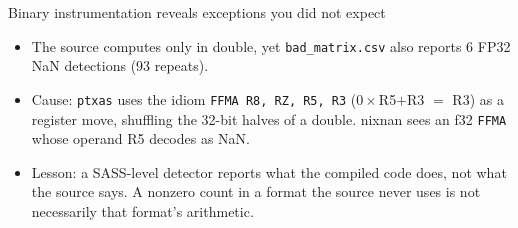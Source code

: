 \documentclass[aspectratio=169,10pt,xcolor=table]{beamer}
\begin{document}
\begin{frame}{Binary instrumentation reveals exceptions you did not expect}
\small
\begin{itemize}
\item The source computes only in double, yet \texttt{bad\_matrix.csv} also reports 6 FP32 NaN detections (93 repeats).
\item Cause: \texttt{ptxas} uses the idiom \texttt{FFMA R8, RZ, R5, R3} ($0\times$R5$+$R3 $=$ R3) as a register move, shuffling the 32-bit halves of a double. nixnan sees an f32 \texttt{FFMA} whose operand R5 decodes as NaN.
\item Lesson: a SASS-level detector reports what the compiled code does, not what the source says. A nonzero count in a format the source never uses is not necessarily that format's arithmetic.
\end{itemize}
\vspace{4mm}\centering
{}
\end{frame}
\end{document}
